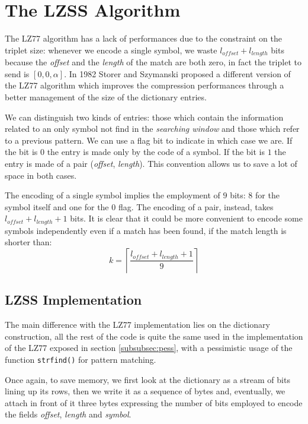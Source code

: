 \section{The LZSS Algorithm}
The LZ77 algorithm has a lack of performances due to the constraint on the triplet size: whenever we encode a single symbol, we waste $l_{offset} + l_{length}$ bits because the \textit{offset} and the \textit{length} of the match are both zero, in fact the triplet to send is $[0, 0, \alpha]$. In 1982 Storer and Szymanski \cite{storer1} proposed a different version of the LZ77 algorithm which improves the compression performances through a better management of the size of the dictionary entries.

We can distinguish two kinds of entries: those which contain the information related to an only symbol not find in the \textit{searching window} and those which refer to a previous pattern. We can use a flag bit to indicate in which case we are. If the bit is $0$ the entry is made only by the code of a symbol. If the bit is $1$ the entry is made of a pair (\textit{offset}, \textit{length}). This convention allows us to save a lot of space in both cases.

The encoding of a single symbol implies the employment of $9$ bits: $8$ for the symbol itself and one for the $0$ flag. The encoding of a pair, instead, takes $l_{offset} + l_{length} + 1$ bits. It is clear that it could be more convenient to encode some symbols independently even if a match has been found, if the match length is shorter than:
\begin{equation}
k = \left \lceil \frac{l_{offset} + l_{length} + 1}{9} \right \rceil
\end{equation}

\subsection{LZSS Implementation}
The main difference with the LZ77 implementation lies on the dictionary construction, all the rest of the code is quite the same used in the implementation of the LZ77 exposed in section \ref{subsubsec:pess}, with a pessimistic usage of the function \texttt{strfind()} for pattern matching.

Once again, to save memory, we first look at the dictionary as a stream of bits lining up its rows, then we write it as a sequence of bytes and, eventually, we attach in front of it three bytes expressing the number of bits employed to encode the fields \textit{offset}, \textit{length} and \textit{symbol}.